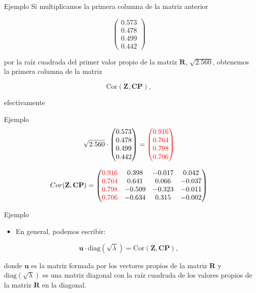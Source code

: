 \documentclass[
  ignorenonframetext,
]{beamer}
\providecommand{\tightlist}{%
  \setlength{\itemsep}{0pt}\setlength{\parskip}{0pt}}
\begin{document}
\begin{frame}{Ejemplo}
\label{ejemplo-28}
Si multiplicamos la primera columna de la matriz anterior

\[\begin{pmatrix}0.573 \\ 0.478\\ 0.499 \\ 0.442\end{pmatrix}\]

por la raíz cuadrada del primer valor propio de la matriz
\(\mathbf{R}\), \(\sqrt{2.560}\), obtenemos la primera columna de la
matriz

\[\mbox{Cor}(\mathbf{Z},\mathbf{CP}),\]

efectivamente
\end{frame}

\begin{frame}{Ejemplo}
\label{ejemplo-29}
\[
\sqrt{2.560}\cdot \begin{pmatrix}0.573 \\ 0.478\\ 0.499 \\ 0.442\end{pmatrix} =
\textcolor{red}{\begin{pmatrix}0.916 \\ 0.764\\ 0.798 \\ 0.706\end{pmatrix}}
\]

\[
Cor(\mathbf{Z},\mathbf{CP}) =
\begin{pmatrix}
\textcolor{red}{0.916} & 0.398 & -0.017 & 0.042 \\
\textcolor{red}{0.764} & 0.641 & 0.066 & -0.037 \\
\textcolor{red}{0.798} & -0.509 & -0.323 & -0.011 \\
\textcolor{red}{0.706} & -0.634 & 0.315 & -0.002 
\end{pmatrix}
\]
\end{frame}

\begin{frame}{Ejemplo}
\label{ejemplo-30}
\begin{itemize}
\tightlist
\item
  En general, podemos escribir:
\end{itemize}

\[
\mathbf{u}\cdot \mbox{diag}(\sqrt{\lambda}) = \mbox{Cor}(\mathbf{Z},\mathbf{CP}),
\]

donde \(\mathbf{u}\) es la matriz formada por los vectores propios de la
matriz \(\mathbf{R}\) y \(\mbox{diag}(\sqrt{\lambda})\) es una matriz
diagonal con la raíz cuadrada de los valores propios de la matriz
\(\mathbf{R}\) en la diagonal.
\end{frame}
\end{document}
